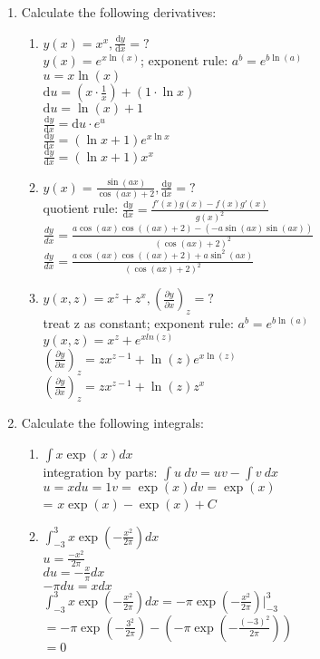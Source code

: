 \documentclass{article}
\begin{document}
\begin{enumerate}
\item Calculate the following derivatives:
    \begin{enumerate}
    \item $y(x)=x^x , \frac{\mathrm{d}y}{\mathrm{d}x} = ?$
    \\ $y(x)=e^{x\ln(x)}$; 
    \quad exponent rule: $a^b = e^{b\ln(a)}$
    \\ $u=x\ln(x)$
    \\ $\mathrm{d}u= (x\cdot \frac{1}{x})+(1\cdot \ln x)$
    \\ $\mathrm{d}u= \ln(x)+1$
    \\$\frac{\mathrm{d}y}{\mathrm{d}x} =\mathrm{d}u\cdot e^u$
    \\$\frac{\mathrm{d}y}{\mathrm{d}x} =(\ln x+1)e^{x\ln x} $
    \\$\frac{\mathrm{d}y}{\mathrm{d}x} =(\ln x+1)x^x $
    \item $y(x)=\frac{\sin(ax)}{\cos(ax)+2}, \frac{\mathrm{d}y}{\mathrm{d}x} = ?$
    \\ quotient rule: $\frac{\mathrm{d}y}{\mathrm{d}x} =\frac{f'(x)g(x)-f(x)g'(x)}{g(x)^2}$
    \\ $\frac{dy}{dx} = \frac{a\cos(ax)\cos((ax)+2)-\left(-a\sin(ax)\sin(ax)\right)}{(\cos(ax)+2)^2}\ $
    \\ $\frac{dy}{dx} = \frac{a\cos(ax)\cos((ax)+2)+a\sin^2(ax)}{(\cos(ax)+2)^2}\ $
    \item $y(x,z)=x^z+z^x,\left(\frac{\partial y}{\partial x}\right)_z = ?$
    \\ treat z as constant; \quad exponent rule: $a^b = e^{b\ln(a)}$
    \\ $y(x,z)=x^z+e^{xln(z)}$
    \\ $\left(\frac{\partial y}{\partial x}\right)_z = zx^{z-1}+\ln(z) e^{x\ln(z)}$
    \\ $\left(\frac{\partial y}{\partial x}\right)_z = zx^{z-1}+\ln(z) z^x$
    \end{enumerate}

\item Calculate the following integrals:
    \begin{enumerate}
    \item $\int x\exp(x)dx$
    \\ integration by parts: $\int u~dv = uv-\int  v~dx$
    \\ $u=x$\quad$du=1$\quad $v=\exp(x)$\quad $dv=\exp(x)$
    \\= $x\exp(x)-\exp(x)+C$
    \item $\int_{-3}^3 x\exp\left(-\frac{x^2}{2\pi}\right)dx$
    \\ $u=\frac{-x^2}{2\pi}$
    \\ $du=-\frac{x}{\pi}dx$
    \\ $-\pi du=x dx$
    \\ $\int_{-3}^3 x\exp\left(-\frac{x^2}{2\pi}\right)dx = -\pi\exp\left(-\frac{x^2}{2\pi}\right)|_{-3}^3$
    \\ $=-\pi\exp\left(-\frac{3^2}{2\pi}\right)-\left(-\pi\exp\left(-\frac{(-3)^2}{2\pi}\right)\right)$
    \\ $=0$
    \end{enumerate}
    

\end{enumerate}
\end{document}
